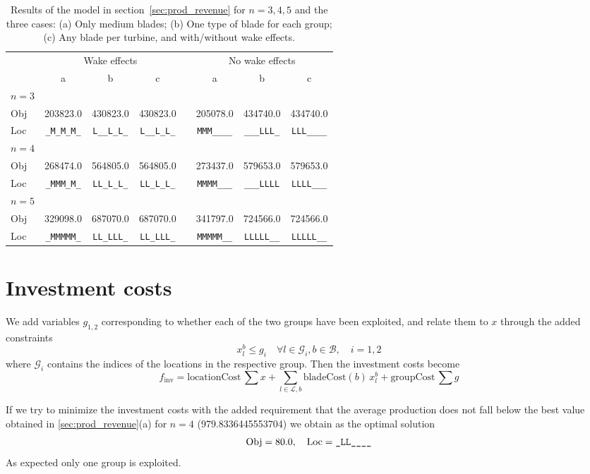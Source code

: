 \documentclass{article}
\renewcommand{\arraystretch}{1.2}
\begin{document}
\begin{table}
	\centering
	\caption{Results of the model in section~\ref{sec:prod_revenue} for $n=3,4,5$ and the three cases:
	(a) Only medium blades;
	(b) One type of blade for each group;
	(c) Any blade per turbine,
	and with/without wake effects. \label{tab:2_res}}
	\renewcommand{\arraystretch}{1.2}
	\begin{tabular}{l ccc c ccc}
		\toprule
		& \multicolumn{3}{c}{Wake effects} && \multicolumn{3}{c}{No wake effects} \\
		\cmidrule{2-4} \cmidrule{6-8}
		& a & b & c && a & b & c \\ \midrule
		$n=3$ \\
		Obj & 203823.0 & 430823.0 & 430823.0 && 205078.0 & 434740.0 & 434740.0 \\
		Loc & \verb+_M_M_M_+ & \verb+L__L_L_+ & \verb+L__L_L_+ &&
		\verb+MMM____+ & \verb+___LLL_+ & \verb+LLL____+ \\

		$n=4$ \\
		Obj & 268474.0 & 564805.0 & 564805.0 && 273437.0 & 579653.0 & 579653.0 \\
		Loc & \verb+_MMM_M_+ & \verb+LL_L_L_+ & \verb+LL_L_L_+ &&
		\verb+MMMM___+ & \verb+___LLLL+ & \verb+LLLL___+ \\

		$n=5$ \\
		Obj & 329098.0 & 687070.0 & 687070.0 && 341797.0 & 724566.0 & 724566.0 \\
		Loc & \verb+_MMMMM_+ & \verb+LL_LLL_+ & \verb+LL_LLL_+ &&
		\verb+MMMMM__+ & \verb+LLLLL__+ & \verb+LLLLL__+ \\
		\bottomrule
	\end{tabular}
\end{table}

\section{Investment costs}
We add variables $g_{1,2}$ corresponding to whether each of the two groups
have been exploited,
and relate them to $x$ through the added constraints
$$ x_l^b \le g_i \quad \forall l \in \mathcal G_i, b \in \mathcal B, \quad i=1,2$$
where $\mathcal G_i$ contains the indices of the locations
in the respective group.
Then the investment costs become
$$ f_\text{inv} = \text{locationCost} \, \sum x + \sum_{l \in \mathcal L, b} \text{bladeCost}(b) \, x_l^b + \text{groupCost} \, \sum g $$

If we try to minimize the investment costs with the added requirement
that the average production does not fall below
the best value obtained in \ref{sec:prod_revenue}(a) for $n=4$
(\num[round-mode=places,round-precision=2]{979.8336445553704})
we obtain as the optimal solution
$$ \text{Obj} = 80.0, \quad \text{Loc} = \verb+_LL____+ $$
As expected only one group is exploited.
\end{document}
